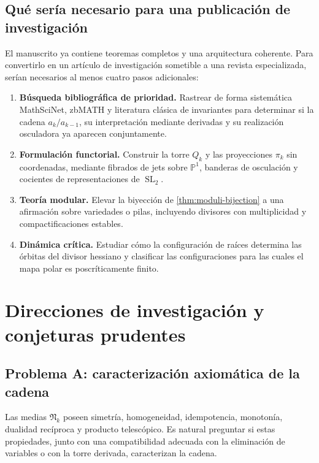 \documentclass[11pt,oneside]{scrartcl}
\theoremstyle{plainblue}
\theoremstyle{definitionblue}
\theoremstyle{remarkgray}
\newcommand{\PP}{\mathbb{P}}
\newcommand{\SL}{\operatorname{SL}}
\newcommand{\cN}{\mathfrak{N}}
\begin{document}
\subsection{Qué sería necesario para una publicación de investigación}

El manuscrito ya contiene teoremas completos y una arquitectura coherente. Para
convertirlo en un artículo de investigación sometible a una revista especializada,
serían necesarios al menos cuatro pasos adicionales:

\begin{enumerate}[leftmargin=9mm]
\item \textbf{Búsqueda bibliográfica de prioridad.} Rastrear de forma sistemática
MathSciNet, zbMATH y literatura clásica de invariantes para determinar si la cadena
\(a_k/a_{k-1}\), su interpretación mediante derivadas y su realización osculadora ya
aparecen conjuntamente.
\item \textbf{Formulación functorial.} Construir la torre \(Q_k\) y las proyecciones
\(\pi_k\) sin coordenadas, mediante fibrados de jets sobre \(\PP^1\), banderas de
osculación y cocientes de representaciones de \(\SL_2\).
\item \textbf{Teoría modular.} Elevar la biyección de \cref{thm:moduli-bijection} a
una afirmación sobre variedades o pilas, incluyendo divisores con multiplicidad y
compactificaciones estables.
\item \textbf{Dinámica crítica.} Estudiar cómo la configuración de raíces determina
las órbitas del divisor hessiano y clasificar las configuraciones para las cuales el
mapa polar es poscríticamente finito.
\end{enumerate}

\section{Direcciones de investigación y conjeturas prudentes}

\subsection{Problema A: caracterización axiomática de la cadena}

Las medias \(\cN_k\) poseen simetría, homogeneidad, idempotencia, monotonía,
dualidad recíproca y producto telescópico. Es natural preguntar si estas propiedades,
junto con una compatibilidad adecuada con la eliminación de variables o con la torre
derivada, caracterizan la cadena.
\end{document}
